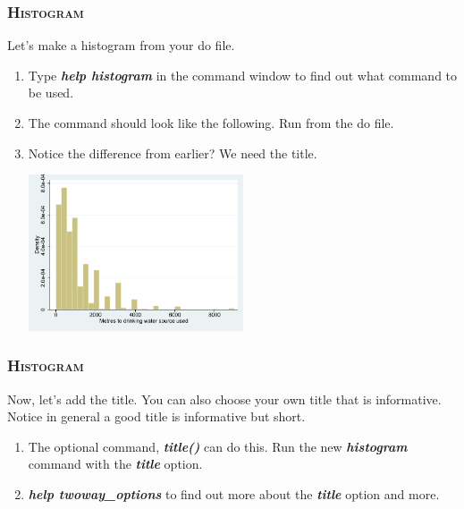 \documentclass[10pt]{beamer}
\begin{document}
	\begin{frame}
	\frametitle{\textsc{Histogram}}	
		 Let's make a histogram from your do file.
		\begin{enumerate}
			 \item Type \textbf{\textit{help histogram}} in the command window to find out what command to be used.
			 \onslide<2-> \item The command should look like the following. Run from the do file.
		
\begin{stlog}\end{stlog}
			\vspace{2mm}
			 \item Notice the difference from earlier? We need the title.
			\vspace{2mm}
		
\begin{center}
    \includegraphics[width=0.5\textwidth]{hist_2.pdf}
\end{center}
		\end{enumerate}
	\end{frame}

	\begin{frame}
	\frametitle{\textsc{Histogram}}	
		 Now, let's add the title. You can also choose your own title that is informative.
					 Notice in general a good title is informative but short.
		\begin{enumerate}
			  \item The optional command, \textbf{\textit{title()}} can do this.
								Run the new \textbf{\textit{histogram}} command with 
								the \textbf{\textit{title}} option.
		
\begin{stlog}\end{stlog}
			\vspace{1mm}
			 \item \textbf{\textit{help twoway\_options}} to find out more about the \textbf{\textit{title}} option and more.
		\end{enumerate}
	\end{frame}
	
\end{document}
